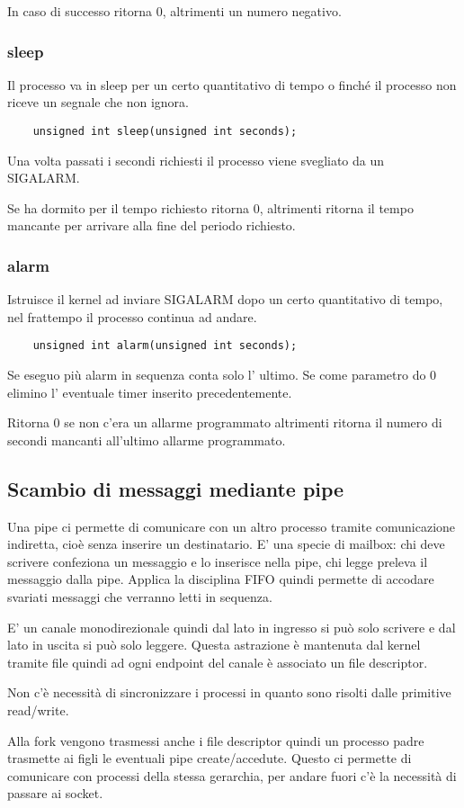 In caso di successo ritorna 0, altrimenti un numero negativo.

\subsubsection{sleep}
Il processo va in sleep per un certo quantitativo di tempo o finché il processo non riceve un segnale che non ignora.
\begin{verbatim}
    unsigned int sleep(unsigned int seconds);
\end{verbatim}
Una volta passati i secondi richiesti il processo viene svegliato da un SIGALARM.

Se ha dormito per il tempo richiesto ritorna 0, altrimenti ritorna il tempo mancante per arrivare alla fine del periodo richiesto.

\subsubsection{alarm}
Istruisce il kernel ad inviare SIGALARM dopo un certo quantitativo di tempo, nel frattempo il processo continua ad andare.
\begin{verbatim}
    unsigned int alarm(unsigned int seconds);
\end{verbatim}

Se eseguo più alarm in sequenza conta solo l' ultimo.
Se come parametro do 0 elimino l' eventuale timer inserito precedentemente.

Ritorna 0 se non c'era un allarme programmato altrimenti ritorna il numero di secondi mancanti all'ultimo allarme programmato.

\subsection{Scambio di messaggi mediante pipe}
Una pipe ci permette di comunicare con un altro processo tramite comunicazione indiretta, cioè senza inserire un destinatario.
E' una specie di mailbox: chi deve scrivere confeziona un messaggio e lo inserisce nella pipe, chi legge preleva il messaggio dalla pipe.
Applica la disciplina FIFO quindi permette di accodare svariati messaggi che verranno letti in sequenza.

E' un canale monodirezionale quindi dal lato in ingresso si può solo scrivere e dal lato in uscita si può solo leggere.
Questa astrazione è mantenuta dal kernel tramite file quindi ad ogni endpoint del canale è associato un file descriptor.

Non c'è necessità di sincronizzare i processi in quanto sono risolti dalle primitive read/write.

Alla fork vengono trasmessi anche i file descriptor quindi un processo padre trasmette ai figli le eventuali pipe create/accedute.
Questo ci permette di comunicare con processi della stessa gerarchia, per andare fuori c'è la necessità di passare ai socket.





